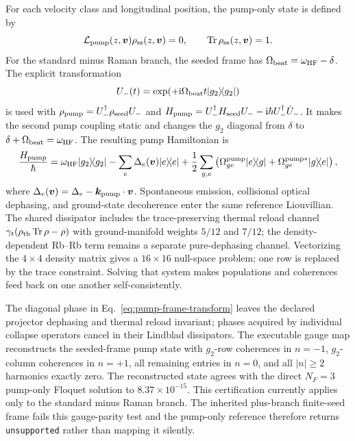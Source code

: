 \documentclass[11pt,a4paper]{article}
\newcommand{\ii}{\mathrm i}
\newcommand{\Tr}{\operatorname{Tr}}
\newcommand{\ketbra}[2]{\lvert #1\rangle\!\langle #2\rvert}
\begin{document}
For each velocity class and longitudinal position, the pump-only state is
defined by
\begin{equation}
\mathcal L_{\rm pump}(z,\bm v)\rho_{\rm ss}(z,\bm v)=0,\qquad
\Tr\rho_{\rm ss}(z,\bm v)=1 .
\label{eq:pump-nullspace}
\end{equation}
For the standard minus Raman branch, the seeded frame has
$\Omega_{\rm beat}=\omega_{\rm HF}-\delta$. The explicit transformation
\begin{equation}
U_-(t)=\exp\!\left(+\ii\Omega_{\rm beat}t\ketbra{g_2}{g_2}\right)
\label{eq:pump-frame-transform}
\end{equation}
is used with $\rho_{\rm pump}=U_-^\dagger\rho_{\rm seed}U_-$ and
$H_{\rm pump}=U_-^\dagger H_{\rm seed}U_- -\ii\hbar
U_-^\dagger\dot U_-$. It makes the second pump coupling static and changes the
$g_2$ diagonal from
$\delta$ to
$\delta+\Omega_{\rm beat}=\omega_{\rm HF}$. The resulting pump Hamiltonian is
\begin{equation}
\frac{H_{\rm pump}}{\hbar}=
\omega_{\rm HF}\ketbra{g_2}{g_2}
-\sum_e\Delta_e(\bm v)\ketbra{e}{e}
+\frac12\sum_{g,e}
\left(\Omega^{\rm pump}_{ge}\ketbra{e}{g}+\Omega^{{\rm pump}*}_{ge}\ketbra{g}{e}\right),
\label{eq:pump-hamiltonian}
\end{equation}
where $\Delta_e(\bm v)=\Delta_e-\bm k_{\rm pump}\cdot\bm v$.
Spontaneous emission, collisional optical dephasing, and ground-state
decoherence enter the same reference Liouvillian. The shared
dissipator includes the trace-preserving thermal reload channel
$\gamma_t(\rho_{\rm th}\Tr\rho-\rho)$ with ground-manifold weights $5/12$ and
$7/12$; the density-dependent Rb--Rb term remains a separate pure-dephasing
channel. Vectorizing the
$4\times4$ density matrix gives a $16\times16$ null-space problem; one row is
replaced by the trace constraint. Solving that system makes populations
and coherences feed back on one another self-consistently.

The diagonal phase in Eq.~\eqref{eq:pump-frame-transform} leaves the declared
projector dephasing and thermal reload invariant; phases acquired by individual
collapse operators cancel in their Lindblad dissipators. The executable gauge
map reconstructs the seeded-frame pump state with $g_2$-row coherences in
$n=-1$, $g_2$-column coherences in $n=+1$, all remaining entries in $n=0$, and
all $|n|\geq2$ harmonics exactly zero. The reconstructed state agrees with the
direct $N_F=3$ pump-only Floquet solution to $8.37\times10^{-15}$. This
certification currently applies only to the standard minus Raman branch. The
inherited plus-branch finite-seed frame fails this gauge-parity test and the
pump-only reference therefore returns \texttt{unsupported} rather than mapping
it silently.
\end{document}
